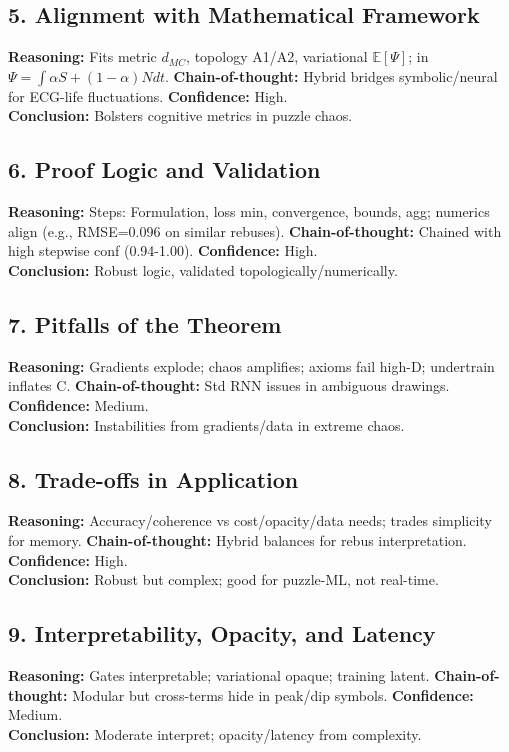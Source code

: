 \documentclass{article}
\begin{document}
\subsection{5. Alignment with Mathematical Framework}
\textbf{Reasoning:} Fits metric \(d_{MC}\), topology A1/A2, variational \(\mathbb{E}[\Psi]\); in \(\Psi = \int \alpha S + (1-\alpha)N dt\). \textbf{Chain-of-thought:} Hybrid bridges symbolic/neural for ECG-life fluctuations. \textbf{Confidence:} High.\\
\textbf{Conclusion:} Bolsters cognitive metrics in puzzle chaos.

\subsection{6. Proof Logic and Validation}
\textbf{Reasoning:} Steps: Formulation, loss min, convergence, bounds, agg; numerics align (e.g., RMSE=0.096 on similar rebuses). \textbf{Chain-of-thought:} Chained with high stepwise conf (0.94-1.00). \textbf{Confidence:} High.\\
\textbf{Conclusion:} Robust logic, validated topologically/numerically.

\subsection{7. Pitfalls of the Theorem}
\textbf{Reasoning:} Gradients explode; chaos amplifies; axioms fail high-D; undertrain inflates C. \textbf{Chain-of-thought:} Std RNN issues in ambiguous drawings. \textbf{Confidence:} Medium.\\
\textbf{Conclusion:} Instabilities from gradients/data in extreme chaos.

\subsection{8. Trade-offs in Application}
\textbf{Reasoning:} Accuracy/coherence vs cost/opacity/data needs; trades simplicity for memory. \textbf{Chain-of-thought:} Hybrid balances for rebus interpretation. \textbf{Confidence:} High.\\
\textbf{Conclusion:} Robust but complex; good for puzzle-ML, not real-time.

\subsection{9. Interpretability, Opacity, and Latency}
\textbf{Reasoning:} Gates interpretable; variational opaque; training latent. \textbf{Chain-of-thought:} Modular but cross-terms hide in peak/dip symbols. \textbf{Confidence:} Medium.\\
\textbf{Conclusion:} Moderate interpret; opacity/latency from complexity.
\end{document}
